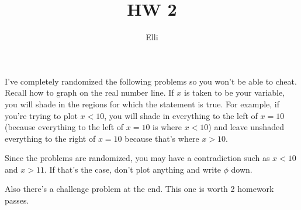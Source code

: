 \documentclass[12pt]{article}
\begin{document}
			\title{HW 2}
			\author{Elli}
			\date{}
			\maketitle
I've completely randomized the following problems so you won't be able to cheat. Recall how to 
graph on the real number line. If $x$ is taken
to be your variable, you will shade in the regions for which the statement is true. For example, if you're
trying to plot $x < 10$, you will shade in everything to the left of $x = 10$ (because everything to the 
left of $x = 10$ is where $x < 10$) and leave unshaded everything to the right of $x = 10$ because that's where
$x > 10$.

Since the problems are randomized, you may have a contradiction such as $x < 10$ and $x > 11$. If that's the case,
don't plot anything and write $\phi$ down.

Also there's a challenge problem at the end. This one is worth 2 homework passes.
\end{document}
